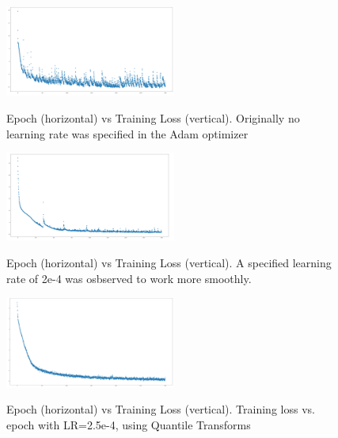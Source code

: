\begin{figure}[htb]
\centering
\includegraphics[width = 0.5\textwidth]{Chapters/Ch3-Simulations/normalizing_flows/pics/MeetingFigures/Bobby/LearningRate/learning_rate_base_case.png}
\label{fig: jul8_pion_comparison2}
\caption{Epoch (horizontal) vs Training Loss (vertical). Originally no learning rate was specified in the Adam optimizer }
\end{figure}



\begin{figure}[htb]
\centering
\includegraphics[width = 0.5\textwidth]{Chapters/Ch3-Simulations/normalizing_flows/pics/MeetingFigures/Bobby/LearningRate/learning_rate_2e-4png.png}
\label{fig: jul8_pion_comparison3}
\caption{Epoch (horizontal) vs Training Loss (vertical). A specified learning rate of 2e-4 was osbserved to work more smoothly.}
\end{figure}



\begin{figure}[htb]
\centering
\includegraphics[width = 0.5\textwidth]{Chapters/Ch3-Simulations/normalizing_flows/pics/MeetingFigures/Bobby/LearningRate/learning_rate_25e-5_with_QT.png}
\label{fig: jul8_pion_comparison4}
\caption{Epoch (horizontal) vs Training Loss (vertical). Training loss vs. epoch with LR=2.5e-4, using Quantile Transforms }
\end{figure}




